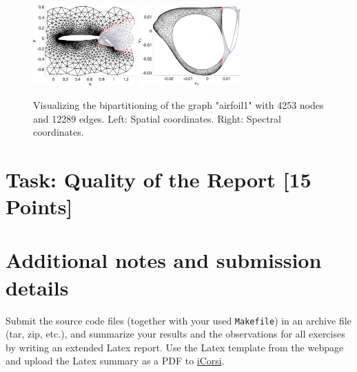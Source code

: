 \documentclass[unicode,11pt,a4paper,oneside,numbers=endperiod,openany]{scrartcl}
\begin{document}
\begin{figure}[!h]
\begin{center}
  \includegraphics[width=0.35\textwidth]{images/airfoil_part_spat.png}
  \includegraphics[width=0.35\textwidth]{images/airfoil_part_spec.png}
  \caption{Visualizing the bipartitioning of the graph "airfoil1" with 4253 nodes and 12289 edges. Left: Spatial coordinates. Right: Spectral coordinates.}
  \label{fig:spectral_layout}
\end{center}
\end{figure}




\section{Task: Quality of the Report [15 Points] }


\section*{Additional notes and submission details}
Submit the source code files (together with your used \texttt{Makefile}) in
an archive file (tar, zip, etc.), and summarize your results and the
observations for all exercises by writing an extended Latex report.
Use the Latex template from the webpage and upload the Latex summary
as a PDF to \href{https://www.icorsi.ch/course/view.php?id=12615}{iCorsi}.
\end{document}
